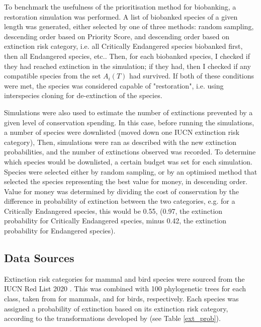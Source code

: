 \documentclass[12pt]{article}
\begin{document}
	To benchmark the usefulness of the prioritisation method for biobanking, a restoration simulation
	was performed. A list of biobanked species of a given length was generated,
	either selected by one of three methods: random sampling,
	descending order based on Priority Score, and descending order
	based on extinction risk category, i.e. all Critically
	Endangered species biobanked first, then all Endangered species, etc.. Then, for each biobanked
	species, I checked if they had reached extinction in the simulation; if they had, then I 
	checked if any compatible species from the set $A_i(T)$ had survived.
	If both of these conditions were met, the species was considered capable of "restoration",
	i.e. using interspecies cloning for de-extinction of the species.
	
	Simulations were also used to estimate the number of extinctions prevented by a given level
	of conservation spending. In this case, before running the simulations, a
	number of species were downlisted (moved down one IUCN extinction
	risk category), Then, simulations
	were ran as described with the new extinction probabilities, and the number of extinctions observed
	was recorded. To determine which species would be downlisted, a certain budget was set for each
	simulation. Species were selected either by random sampling, or by an optimised method
	that selected the species representing the best value for money,
	in descending order. Value for money was determined by dividing the cost of conservation
	by the difference in probability of extinction between the two categories, e.g. for
	a Critically Endangered species, this would be 0.55,
	(0.97, the extinction probability for Critically
	Endangered species, minus 0.42, the extinction probability for Endangered
	species).
	
	\subsection{Data Sources}
	Extinction risk categories for mammal and bird species were
	sourced from the IUCN Red List 2020 \citep{iucnIUCNRedList2021, iucnIUCNRedList2012}. This was combined with 100 phylogenetic trees for each class, taken from \citet{uphamInferringMammalTree2019}
	for mammals, and \citet{jetzGlobalDiversityBirds2012} for birds, respectively.
	Each species was assigned a probability of extinction based on its
	extinction risk category, according to the transformations developed by \citet{mooersConvertingEndangeredSpecies2008} (see Table \ref{ext_prob}).
	
\end{document}
